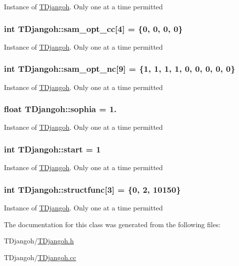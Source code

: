 Instance of \hyperlink{class_t_djangoh}{T\+Djangoh}. Only one at a time permitted \hypertarget{class_t_djangoh_a082064f93cd8e978c454044ab86b3007}{
\subsubsection[{sam\+\_\+opt\+\_\+cc}]{\setlength{\rightskip}{0pt plus 5cm}int T\+Djangoh\+::sam\+\_\+opt\+\_\+cc\mbox{[}4\mbox{]} = \{0, 0, 0, 0\}}}\label{class_t_djangoh_a082064f93cd8e978c454044ab86b3007}
Instance of \hyperlink{class_t_djangoh}{T\+Djangoh}. Only one at a time permitted \hypertarget{class_t_djangoh_adce1a30080fb56c2fb635826eebd05da}{
\subsubsection[{sam\+\_\+opt\+\_\+nc}]{\setlength{\rightskip}{0pt plus 5cm}int T\+Djangoh\+::sam\+\_\+opt\+\_\+nc\mbox{[}9\mbox{]} = \{1, 1, 1, 1, 0, 0, 0, 0, 0\}}}\label{class_t_djangoh_adce1a30080fb56c2fb635826eebd05da}
Instance of \hyperlink{class_t_djangoh}{T\+Djangoh}. Only one at a time permitted \hypertarget{class_t_djangoh_a1ecc5438155094281e9867acb6b4432f}{
\subsubsection[{sophia}]{\setlength{\rightskip}{0pt plus 5cm}float T\+Djangoh\+::sophia = 1.}}\label{class_t_djangoh_a1ecc5438155094281e9867acb6b4432f}
Instance of \hyperlink{class_t_djangoh}{T\+Djangoh}. Only one at a time permitted \hypertarget{class_t_djangoh_a8e88fc34f9f5e6e0b62af4054bbe9ce3}{
\subsubsection[{start}]{\setlength{\rightskip}{0pt plus 5cm}int T\+Djangoh\+::start = 1}}\label{class_t_djangoh_a8e88fc34f9f5e6e0b62af4054bbe9ce3}
Instance of \hyperlink{class_t_djangoh}{T\+Djangoh}. Only one at a time permitted \hypertarget{class_t_djangoh_ad5881cf0e0f935682730fae53e30798b}{
\subsubsection[{structfunc}]{\setlength{\rightskip}{0pt plus 5cm}int T\+Djangoh\+::structfunc\mbox{[}3\mbox{]} = \{0, 2, 10150\}}}\label{class_t_djangoh_ad5881cf0e0f935682730fae53e30798b}
Instance of \hyperlink{class_t_djangoh}{T\+Djangoh}. Only one at a time permitted 

The documentation for this class was generated from the following files\+:\begin{DoxyCompactItemize}
\item 
T\+Djangoh/\hyperlink{_t_djangoh_8h}{T\+Djangoh.\+h}\item 
T\+Djangoh/\hyperlink{_t_djangoh_8cc}{T\+Djangoh.\+cc}\end{DoxyCompactItemize}
